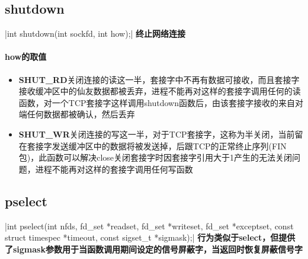 \subsection{shutdown}
|int shutdown(int sockfd, int how);|
\noindent \textbf{终止网络连接}
\begin{spacing}{2.0}
\paragraph{how的取值}
\begin{itemize}
	\item \textbf{SHUT\_RD}关闭连接的读这一半，套接字中不再有数据可接收，而且套接字接收缓冲区中的仙友数据都被丢弃，进程不能再对这样的套接字调用任何的读函数，对一个TCP套接字这样调用shutdown函数后，由该套接字接收的来自对端任何数据都被确认，然后丢弃
	\item \textbf{SHUT\_WR}关闭连接的写这一半，对于TCP套接字，这称为半关闭，当前留在套接字发送缓冲区中的数据将被发送掉，后跟TCP的正常终止序列(FIN包)，此函数可以解决close关闭套接字时因套接字引用大于1产生的无法关闭问题，进程不能再对这样的套接字调用任何写函数
\end{itemize}
\end{spacing}
\newpage

\subsection{pselect}
|int pselect(int nfds, fd_set *readset, fd_set *writeset, fd_set *exceptset, const struct timespec *timeout, const sigset_t *sigmask);|
\noindent \textbf{行为类似于select，但提供了sigmask参数用于当函数调用期间设定的信号屏蔽字，当返回时恢复屏蔽信号字}
\begin{spacing}{2.0}

\end{spacing}
\newpage

